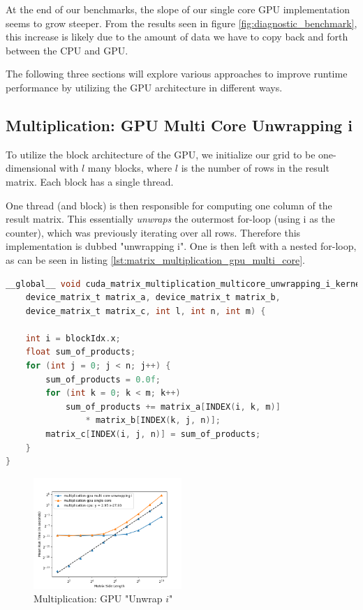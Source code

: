 At the end of our benchmarks, the slope of our single core GPU implementation seems to grow steeper. From the results seen in figure \ref{fig:diagnostic_benchmark}, this increase is likely due to the amount of data we have to copy back and forth between the CPU and GPU.

The following three sections will explore various approaches to improve runtime performance by utilizing the GPU architecture in different ways.

\subsection{Multiplication: GPU Multi Core Unwrapping i}

To utilize the block architecture of the GPU, we initialize our grid to be one-dimensional with $l$ many blocks, where $l$ is the number of rows in the result matrix. Each block has a single thread.

One thread (and block) is then responsible for computing one column of the result matrix. This essentially \textit{unwraps} the outermost for-loop (using i as the counter), which was previously iterating over all rows. Therefore this implementation is dubbed "unwrapping i". One is then left with a nested for-loop, as can be seen in listing \ref{lst:matrix_multiplication_gpu_multi_core}.

\begin{lstlisting}[language=C, caption={Multi Core Matrix Multiplication "Unwrapping $i$"}, label={lst:matrix_multiplication_gpu_multi_core}]
__global__ void cuda_matrix_multiplication_multicore_unwrapping_i_kernel(
    device_matrix_t matrix_a, device_matrix_t matrix_b,
    device_matrix_t matrix_c, int l, int n, int m) {

    int i = blockIdx.x;
    float sum_of_products;
    for (int j = 0; j < n; j++) {
        sum_of_products = 0.0f;
        for (int k = 0; k < m; k++)
            sum_of_products += matrix_a[INDEX(i, k, m)] 
                * matrix_b[INDEX(k, j, n)];
        matrix_c[INDEX(i, j, n)] = sum_of_products;
    }
}
\end{lstlisting}

\begin{figure}[h]
  \includegraphics[width=0.5\textwidth]{SavedBenchmarksAndDiagrams/Machine 2/Multiplication/GPU MC Unwrap i.png}
  \centering
  \caption{Multiplication: GPU "Unwrap $i$"}
  \label{fig:mul_unwrap_i_bench}
\end{figure}

